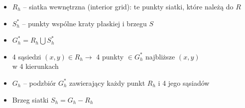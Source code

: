\begin{frame}
  \begin{block}{}
    \begin{itemize}
      \item $R_h$ -- siatka wewnętrzna (interior grid): te punkty siatki, które należą do $R$
      \item $S_h^*$ -- punkty wspólne kraty płaskiej i brzegu $S$
      \item $G_h^* = R_h \bigcup S_h^*$
      \item 4 sąsiedzi $(x,y) \in R_h \rightarrow$ 4 punkty $\in G_h^*$ najbliższe $(x,y)$  \\
w 4 kierunkach
      \item $G_h$ -- podzbiór $G_h^*$ zawierający każdy punkt $R_h$ i 4 jego sąsiadów
      \item Brzeg siatki $S_h = G_h - R_h$
    \end{itemize}
  \end{block}
\end{frame}
